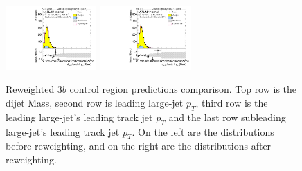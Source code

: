 \begin{figure}[htbp!]
\begin{center}
\includegraphics[width=0.31\textwidth,angle=-90]{figures/boosted/Prereweight/Moriond_ThreeTag_Control_sublHCand_trk0_Pt.pdf}
\includegraphics[width=0.31\textwidth,angle=-90]{figures/boosted/Control/b77_ThreeTag_Control_sublHCand_trk0_Pt.pdf}\\
\caption{Reweighted $3b$ control region predictions comparison. Top row is the dijet Mass, second row is leading large-\R jet $p_{T}$, third row is the leading large-\R jet's leading track jet $p_T$ and the last row subleading large-\R jet's leading track jet $p_T$. On the left are the distributions before reweighting, and on the right are the distributions after reweighting.}
\label{fig:rw-3b-comp-cr}
\end{center}
\end{figure}


